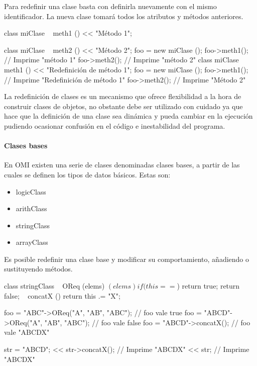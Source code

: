 Para redefinir una clase basta con definirla nuevamente con el mismo identificador. La nueva 
clase tomará todos los atributos y métodos anteriores. \\

\begin{myverbatim}
   class miClase {
      ~ meth1 () {
         << "Método 1";
      }
   }
   
   class miClase {
      ~ meth2 () {
         << "Método 2";
      }
   }
   foo = new miClase ();
   foo->meth1(); // Imprime "método 1"
   foo->meth2(); // Imprime "método 2"
   class miClase {
      ~ meth1 () {
         << "Redefinición de método 1";
      }
   }
   foo = new miClase ();
   foo->meth1(); // Imprime "Redefinición de método 1"
   foo->meth2(); // Imprime "Método 2"
\end{myverbatim}

La redefinición de clases es un mecanismo que ofrece flexibilidad a la hora de construir clases de objetos, no obstante 
debe ser utilizado con cuidado ya que hace que la definición de una clase sea dinámica y pueda cambiar en la ejecución 
pudiendo ocasionar confusión en el código e inestabilidad del programa.

\paragraph{Clases bases}
En OMI existen una serie de clases denominadas clases bases, a partir de las 
cuales se definen los tipos de datos básicos. Estas son:

\begin{itemize}
\item logicClass
\item arithClass
\item stringClass
\item arrayClass
\end{itemize}

Es posible redefinir una clase base y modificar su comportamiento, añadiendo o sustituyendo 
métodos. \\

\begin{myverbatim}
   class stringClass {
      ~ OReq (elems) {
         $(elems)
            if (this == $) 
               return true;
         return false;
      }
      ~ concatX () {
         return this .= "X";
      }
   }

   foo = "ABC"->OReq({"A", "AB", "ABC"}); // foo vale true
   foo = "ABCD"->OReq({"A", "AB", "ABC"}); // foo vale false
   foo = "ABCD"->concatX(); // foo vale "ABCDX"
   
   str = "ABCD";
   << str->concatX(); // Imprime "ABCDX"
   << str; // Imprime "ABCDX"
\end{myverbatim}

